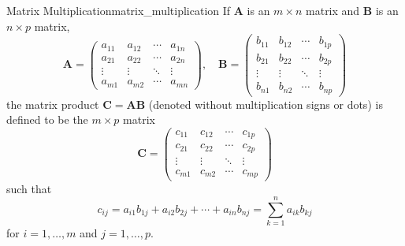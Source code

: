 \begin{definition}{Matrix Multiplication}{matrix_multiplication}
If $\mathbf{A}$ is an $m \times n$ matrix and $\mathbf{B}$ is an $n \times p$ matrix,
$$
\mathbf{A}=\left(\begin{array}{cccc}
a_{11} & a_{12} & \cdots & a_{1 n} \\
a_{21} & a_{22} & \cdots & a_{2 n} \\
\vdots & \vdots & \ddots & \vdots \\
a_{m 1} & a_{m 2} & \cdots & a_{m n}
\end{array}\right), \quad \mathbf{B}=\left(\begin{array}{cccc}
b_{11} & b_{12} & \cdots & b_{1 p} \\
b_{21} & b_{22} & \cdots & b_{2 p} \\
\vdots & \vdots & \ddots & \vdots \\
b_{n 1} & b_{n 2} & \cdots & b_{n p}
\end{array}\right)
$$
the matrix product $\mathbf{C}=\mathbf{A B}$ (denoted without multiplication signs or dots) is defined to be the $m \times p$ matrix 
$$
\mathbf{C}=\left(\begin{array}{cccc}
c_{11} & c_{12} & \cdots & c_{1 p} \\
c_{21} & c_{22} & \cdots & c_{2 p} \\
\vdots & \vdots & \ddots & \vdots \\
c_{m 1} & c_{m 2} & \cdots & c_{m p}
\end{array}\right)
$$
such that
$$
c_{i j}=a_{i 1} b_{1 j}+a_{i 2} b_{2 j}+\cdots+a_{i n} b_{n j}=\sum_{k=1}^{n} a_{i k} b_{k j}
$$
for $i=1, \ldots, m$ and $j=1, \ldots, p$.
\end{definition}
